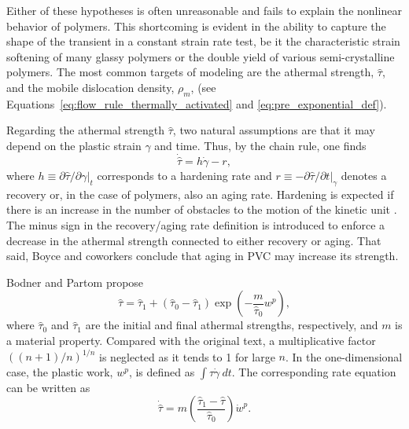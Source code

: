 Either of these hypotheses is often unreasonable and fails to explain the nonlinear behavior of polymers.
This shortcoming is evident in the ability to capture the shape of the transient in a constant strain rate test, be it the characteristic strain softening of many glassy polymers or the double yield of various semi-crystalline polymers.
The most common targets of modeling are the athermal strength, $\hat \tau$, and the mobile dislocation density, $\rho_m$, (see Equations~\eqref{eq:flow_rule_thermally_activated} and \eqref{eq:pre_exponential_def}).

Regarding the athermal strength $\hat \tau$, two natural assumptions are that it may depend on the plastic strain $\gamma$ and time.
Thus, by the chain rule, one finds
\begin{equation}
  \dot{\hat \tau} = h \dot\gamma - r,
\end{equation}
where $h\equiv \partial \hat \tau/\partial \gamma |_t$ corresponds to a hardening rate and $r\equiv - \partial \hat \tau/\partial t|_\gamma$ denotes a recovery or, in the case of polymers, also an aging rate.
Hardening is expected if there is an increase in the number of obstacles to the motion of the kinetic unit \citep{kocks1975thermodynamics, hasanConstitutiveModelNonlinear1995}.
The minus sign in the recovery/aging rate definition is introduced to enforce a decrease in the athermal strength connected to either recovery or aging.
That said, Boyce and coworkers \citep{boyceLargeInelasticDeformation1988} conclude that aging in PVC may increase its strength.

Bodner and Partom \citep{bodnerConstitutiveEquationsElasticViscoplastic1975} propose
\begin{equation}
  \hat \tau = {\hat \tau}_1 + ({\hat \tau}_0 - {\hat \tau}_1)\exp\left(-\frac{m}{{\hat \tau}_0}w^p\right),
\end{equation}
where ${\hat \tau}_0$ and ${\hat \tau}_1$ are the initial and final athermal strengths, respectively, and $m$ is a material property.
Compared with the original text, a multiplicative factor $((n+1)/n)^{1/n}$ is neglected as it tends to 1 for large $n$.
In the one-dimensional case, the plastic work, $w^p$, is defined as $\int \tau\dot \gamma\ dt$.
The corresponding rate equation can be written as \citep{zairiElastoviscoplasticConstitutiveEquations2007}
\begin{equation}
  \label{eq:bodner_partom_rate_eq}
  \dot{\hat \tau} = m\left(\frac{{\hat \tau}_1 - {\hat \tau}}{{\hat \tau}_0}\right)\dot w^p.
\end{equation}

